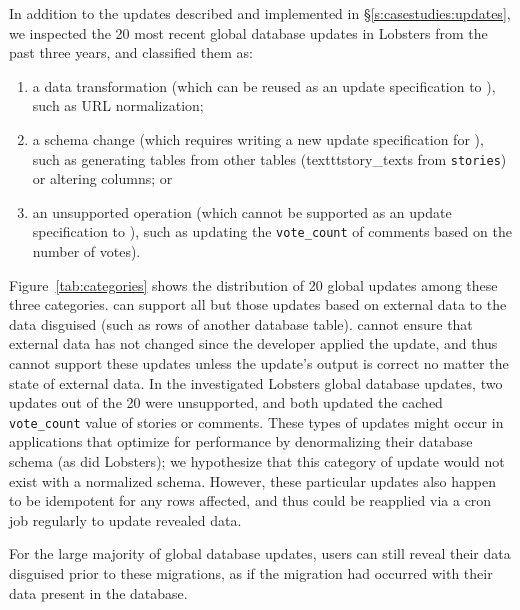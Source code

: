%
In addition to the updates described and implemented in
\S\ref{s:casestudies:updates}, we inspected the 20 most recent
global database updates in
Lobsters from the past three years, and classified them as:
\begin{enumerate}[nosep]
%
    \item a data transformation (which can be reused as an update specification to \sys), such as URL
normalization; 
%
\item a schema change (which requires writing a new update specification for \sys), such as
generating tables from other tables (\eg texttt{story\_texts} from
\texttt{stories}) or altering columns; or
%
\item an unsupported operation (which cannot be supported as an update
    specification to 
    \sys), such as updating the \texttt{vote\_count} of comments based on the number of votes).
\end{enumerate}
Figure~\ref{tab:categories} shows the distribution of 20 global updates among these
three categories. 
%
\sys can support all but those updates based on external data to the data
disguised (such as rows of another database table).  \sys cannot ensure that
external data has not changed since the developer applied the update, and thus
cannot support these updates unless the update's output is correct no matter the
state of external data. In the investigated Lobsters global database updates,
two updates out of the 20 were unsupported, and both updated the cached
\texttt{vote\_count} value of stories or comments.
%
%
%
These types of updates might occur in applications that optimize for
performance by denormalizing their database schema (as did Lobsters); we
hypothesize that this category of update would not exist with a normalized
schema.
%
However, these particular updates also happen to be idempotent for any rows
affected, and thus could be reapplied via a cron job regularly to update
revealed data.
%

%
For the large majority of global database updates, users can still reveal
their data disguised prior to these migrations, as if the migration had occurred
with their data present in the database.

%

